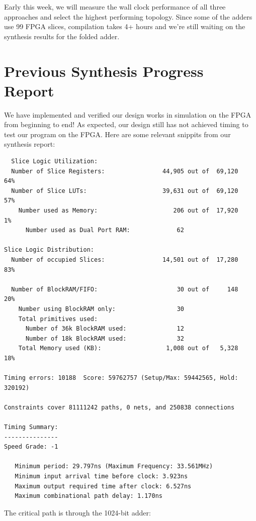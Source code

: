 \documentclass[12pt]{article}
\begin{document}
Early this week, we will measure the wall clock performance of all three approaches
and select the highest performing topology. Since some of the adders use 99%
FPGA slices, compilation takes 4+ hours and we're still waiting on the 
synthesis results for the folded adder.


\section{Previous Synthesis Progress Report}

We have implemented and verified our design works in simulation on the FPGA from beginning to end!  As expected, our design still has not achieved timing to test our program on the FPGA.  Here are some relevant snippits from our synthesis report: \
\begin{verbatim}
  Slice Logic Utilization:
  Number of Slice Registers:                44,905 out of  69,120   64%
  Number of Slice LUTs:                     39,631 out of  69,120   57%
    Number used as Memory:                     206 out of  17,920    1%
      Number used as Dual Port RAM:             62

Slice Logic Distribution:
  Number of occupied Slices:                14,501 out of  17,280   83%

  Number of BlockRAM/FIFO:                      30 out of     148   20%
    Number using BlockRAM only:                 30
    Total primitives used:
      Number of 36k BlockRAM used:              12
      Number of 18k BlockRAM used:              32
    Total Memory used (KB):                  1,008 out of   5,328   18%

Timing errors: 10188  Score: 59762757 (Setup/Max: 59442565, Hold: 320192)

Constraints cover 81111242 paths, 0 nets, and 250838 connections

Timing Summary:
---------------
Speed Grade: -1

   Minimum period: 29.797ns (Maximum Frequency: 33.561MHz)
   Minimum input arrival time before clock: 3.923ns
   Maximum output required time after clock: 6.527ns
   Maximum combinational path delay: 1.170ns
\end{verbatim}

The critical path is through the 1024-bit adder:
\end{document}
